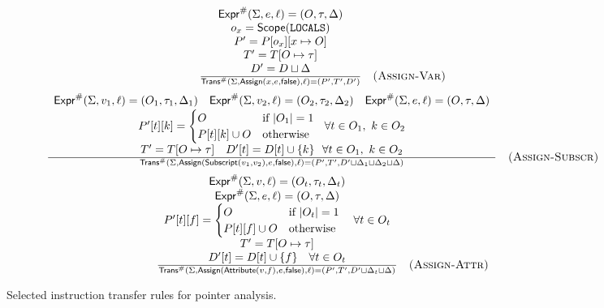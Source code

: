 \begin{figure*}[t]
\centering
\[
\begin{array}{c}
\frac{
  \begin{array}{c}
    \mathsf{Expr}^\#(\Sigma,e,\ell) = (O,\tau,\Delta) \\
    o_x = \mathsf{Scope}(\mathtt{LOCALS}) \\
    P' = P[o_x][x \mapsto O] \\
    T' = T[O \mapsto \tau] \\
    D' = D \sqcup \Delta
  \end{array}
}{
  \mathsf{Trans}^\#(\Sigma,\mathsf{Assign}(x,e,\mathsf{false}),\ell) = (P',T',D')
} \quad \textsc{(Assign-Var)}
\\[2ex]
\frac{
  \begin{array}{c}
    \mathsf{Expr}^\#(\Sigma, v_1, \ell) = (O_1, \tau_1, \Delta_1) \quad
    \mathsf{Expr}^\#(\Sigma, v_2, \ell) = (O_2, \tau_2, \Delta_2) \quad
    \mathsf{Expr}^\#(\Sigma, e, \ell) = (O, \tau, \Delta) \\[0.3ex]
    P'[t][k] =
      \begin{cases}
        O & \text{if } |O_1| = 1 \\
        P[t][k] \cup O & \text{otherwise}
      \end{cases} \ \ \forall t \in O_1, \ k \in O_2 \\[0.3ex]
    T' = T[O \mapsto \tau] \quad
    D'[t] = D[t] \cup \{k\} \ \ \forall t \in O_1, \ k \in O_2
  \end{array}
}{
  \mathsf{Trans}^\#(\Sigma, \mathsf{Assign}(\mathsf{Subscript}(v_1, v_2), e, \mathsf{false}), \ell)
  = (P', T', D' \sqcup \Delta_1 \sqcup \Delta_2 \sqcup \Delta)
}
\quad \textsc{(Assign-Subscr)}
\\[2.0ex]
\frac{
  \begin{array}{c}
    \mathsf{Expr}^\#(\Sigma,v,\ell) = (O_t,\tau_t,\Delta_t) \\
    \mathsf{Expr}^\#(\Sigma,e,\ell) = (O,\tau,\Delta) \\
    P'[t][f] =
      \begin{cases}
        O & \text{if } |O_t|=1 \\
        P[t][f] \cup O & \text{otherwise}
      \end{cases} \quad \forall t\in O_t \\
    T' = T[O \mapsto \tau] \\
    D'[t] = D[t] \cup \{f\} \quad \forall t\in O_t
  \end{array}
}{
  \mathsf{Trans}^\#(\Sigma,\mathsf{Assign}(\mathsf{Attribute}(v,f),e,\mathsf{false}),\ell)
    = (P',T',D' \sqcup \Delta_t \sqcup \Delta)
} \quad \textsc{(Assign-Attr)}
\end{array}
\]
\caption{Selected instruction transfer rules for pointer analysis.}
\label{fig:trans-semantics}
\end{figure*}

